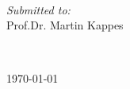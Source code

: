 \begin{titlepage}
\begin{minipage}{0.5\textwidth}
\begin{flushleft}
\end{flushleft}
\end{minipage}
~
\begin{minipage}{0.4\textwidth}
\begin{flushright} \large
\emph{Submitted to:} \\
Prof.Dr. Martin Kappes \\[1.2em] 
\end{flushright}
\end{minipage}\\[2cm]
\makeatother


{\large \today}\\[2cm] %

\vfill %

\end{titlepage}
